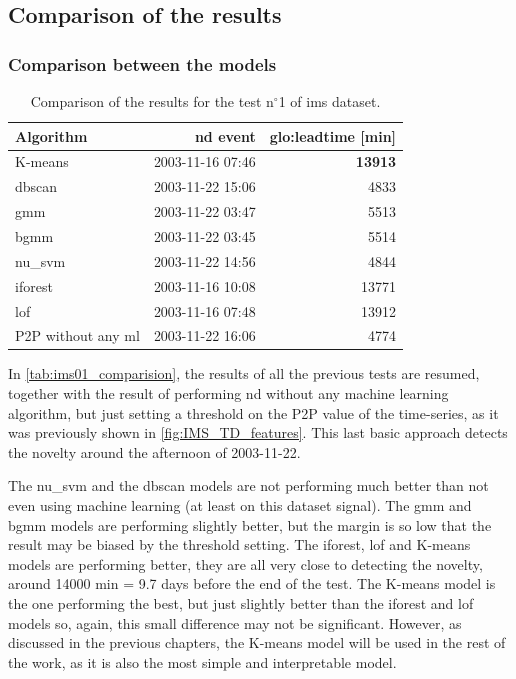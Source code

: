 \subsection{Comparison of the results}

\subsubsection{Comparison between the models}

\begin{table}
    \centering
    \caption{Comparison of the results for the test $\text{n}^\circ$1 of \gls{ims} dataset.}
    \label{tab:ims01_comparision}
    \begin{tabular}{lrr} 
    \toprule
    \textbf{Algorithm} & \textbf{\gls{nd} event} & \textbf{\gls{glo:leadtime} }{[}min] \\ 
    \hline
    K-means & 2003-11-16 07:46 & \textbf{13913} \\
    \gls{dbscan} & 2003-11-22 15:06 & 4833 \\
    \gls{gmm} & 2003-11-22 03:47 & 5513 \\
    \gls{bgmm} & 2003-11-22 03:45 & 5514 \\
    \gls{nu_svm} & 2003-11-22 14:56 & 4844 \\
    \gls{iforest} & 2003-11-16 10:08 & 13771 \\
    \gls{lof} & 2003-11-16 07:48 & 13912 \\
    {P2P} without any \gls{ml} & 2003-11-22 16:06 & 4774 \\
    \bottomrule
    \end{tabular}
\end{table}

In \autoref{tab:ims01_comparision}, the results of all the previous tests are resumed, together with the result of performing \gls{nd} without any machine learning algorithm, but just setting a threshold on the P2P value of the time-series, as it was previously shown in \autoref{fig:IMS_TD_features}. This last basic approach detects the novelty around the afternoon of 2003-11-22. 

The \gls{nu_svm} and the \gls{dbscan} models are not performing much better than not even using machine learning (at least on this dataset signal). The \gls{gmm} and \gls{bgmm} models are performing slightly better, but the margin is so low that the result may be biased by the threshold setting. The \gls{iforest}, \gls{lof} and K-means models are performing better, they are all very close to detecting the novelty, around 14000 min = 9.7 days before the end of the test. The K-means model is the one performing the best, but just slightly better than the \gls{iforest} and \gls{lof} models so, again, this small difference may not be significant. However, as discussed in the previous chapters, the K-means model will be used in the rest of the work, as it is also the most simple and interpretable model.


